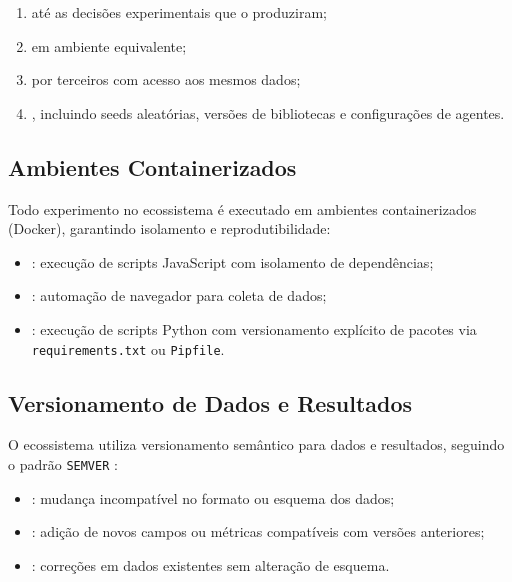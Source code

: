 \begin{enumerate}
\item {} até as decisões
experimentais que o produziram;
\item {} em ambiente
equivalente;
\item {} por terceiros com
acesso aos mesmos dados;
\item {},
incluindo seeds aleatórias, versões de bibliotecas e configurações
de agentes.
\end{enumerate}

\subsection{Ambientes Containerizados}

Todo experimento no ecossistema é executado em ambientes
containerizados (Docker), garantindo isolamento e reprodutibilidade:

\begin{itemize}
\item {}: execução de scripts JavaScript com
isolamento de dependências;
\item {}: automação de
navegador para coleta de dados;
\item {}: execução de scripts Python com
versionamento explícito de pacotes via \texttt{requirements.txt} ou
\texttt{Pipfile}.
\end{itemize}

\subsection{Versionamento de Dados e Resultados}

O ecossistema utiliza versionamento semântico para dados e
resultados, seguindo o padrão \texttt{SEMVER} \cite{preston2011semver}:

\begin{itemize}
\item {}: mudança incompatível no formato
ou esquema dos dados;
\item {}: adição de novos campos ou métricas
compatíveis com versões anteriores;
\item {}: correções em dados existentes sem
alteração de esquema.
\end{itemize}

